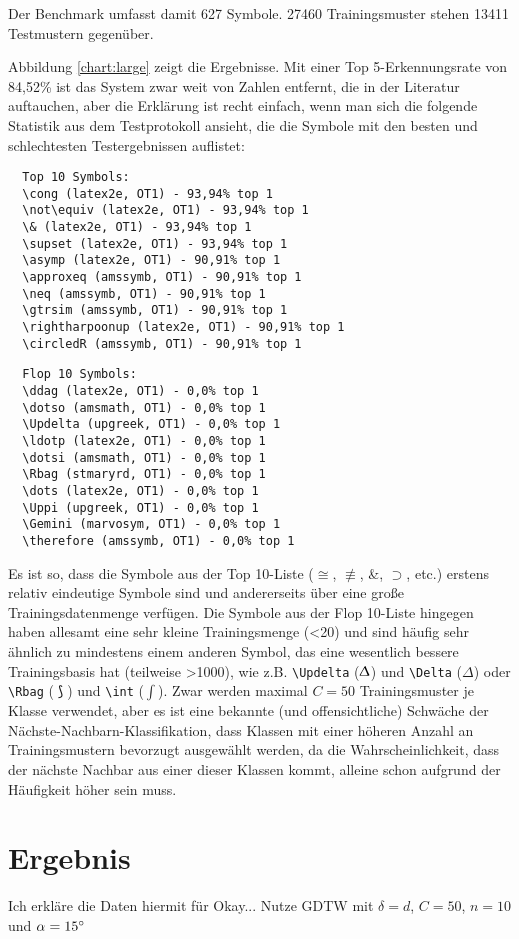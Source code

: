 Der Benchmark umfasst damit 627 Symbole. 27460 Trainingsmuster stehen 13411 Testmustern gegenüber.

Abbildung \ref{chart:large} zeigt die Ergebnisse. Mit einer Top 5-Erkennungsrate von 84,52\% ist das System zwar weit von Zahlen entfernt, die in der Literatur auftauchen, aber die Erklärung ist recht einfach, wenn man sich die folgende Statistik aus dem Testprotokoll ansieht, die die Symbole mit den besten und schlechtesten Testergebnissen auflistet:

\begin{verbatim}
  Top 10 Symbols:
  \cong (latex2e, OT1) - 93,94% top 1
  \not\equiv (latex2e, OT1) - 93,94% top 1
  \& (latex2e, OT1) - 93,94% top 1
  \supset (latex2e, OT1) - 93,94% top 1
  \asymp (latex2e, OT1) - 90,91% top 1
  \approxeq (amssymb, OT1) - 90,91% top 1
  \neq (amssymb, OT1) - 90,91% top 1
  \gtrsim (amssymb, OT1) - 90,91% top 1
  \rightharpoonup (latex2e, OT1) - 90,91% top 1
  \circledR (amssymb, OT1) - 90,91% top 1
\end{verbatim}
  
\begin{verbatim}
  Flop 10 Symbols:
  \ddag (latex2e, OT1) - 0,0% top 1
  \dotso (amsmath, OT1) - 0,0% top 1
  \Updelta (upgreek, OT1) - 0,0% top 1
  \ldotp (latex2e, OT1) - 0,0% top 1
  \dotsi (amsmath, OT1) - 0,0% top 1
  \Rbag (stmaryrd, OT1) - 0,0% top 1
  \dots (latex2e, OT1) - 0,0% top 1
  \Uppi (upgreek, OT1) - 0,0% top 1
  \Gemini (marvosym, OT1) - 0,0% top 1
  \therefore (amssymb, OT1) - 0,0% top 1
\end{verbatim}

Es ist so, dass die Symbole aus der Top 10-Liste ($\cong$, $\not\equiv$, \&, $\supset$, etc.) erstens relativ eindeutige Symbole sind und andererseits über eine große Trainingsdatenmenge verfügen. Die Symbole aus der Flop 10-Liste hingegen haben allesamt eine sehr kleine Trainingsmenge (<20) und sind häufig sehr ähnlich zu mindestens einem anderen Symbol, das eine wesentlich bessere Trainingsbasis hat (teilweise >1000), wie z.B. \verb!\Updelta! ($\Updelta$) und \verb!\Delta! ($\Delta$) oder \verb!\Rbag! ($\Rbag$) und \verb!\int! ($\int$). Zwar werden maximal $C=50$ Trainingsmuster je Klasse verwendet, aber es ist eine bekannte (und offensichtliche) Schwäche der Nächste-Nachbarn-Klassifikation, dass Klassen mit einer höheren Anzahl an Trainingsmustern bevorzugt ausgewählt werden, da die Wahrscheinlichkeit, dass der nächste Nachbar aus einer dieser Klassen kommt, alleine schon aufgrund der Häufigkeit höher sein muss.

\section{Ergebnis}

\TODO Ich erkläre die Daten hiermit für Okay...
\TODO Nutze GDTW mit $\delta=d$, $C=50$, $n=10$ und $\alpha=15\degree$